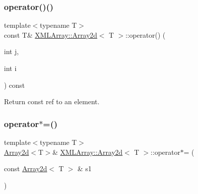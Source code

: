 \mbox{\label{classXMLArray_1_1Array2d_aa02dc8ee58bd33aca0cfbbf58cbf1ba7}} 
\subsubsection{\texorpdfstring{operator()()}{operator()()}\hspace{0.1cm}{\footnotesize\ttfamily [4/4]}}
{\footnotesize\ttfamily template$<$typename T$>$ \\
const T\& \mbox{\hyperlink{classXMLArray_1_1Array2d}{X\+M\+L\+Array\+::\+Array2d}}$<$ T $>$\+::operator() (\begin{DoxyParamCaption}\item[{int}]{j,  }\item[{int}]{i }\end{DoxyParamCaption}) const\hspace{0.3cm}{\ttfamily [inline]}}



Return const ref to an element. 

\mbox{\label{classXMLArray_1_1Array2d_a591d1e6e7de9fd024657bb6e9264a89b}} 
\subsubsection{\texorpdfstring{operator$\ast$=()}{operator*=()}\hspace{0.1cm}{\footnotesize\ttfamily [1/4]}}
{\footnotesize\ttfamily template$<$typename T$>$ \\
\mbox{\hyperlink{classXMLArray_1_1Array2d}{Array2d}}$<$T$>$\& \mbox{\hyperlink{classXMLArray_1_1Array2d}{X\+M\+L\+Array\+::\+Array2d}}$<$ T $>$\+::operator$\ast$= (\begin{DoxyParamCaption}\item[{const \mbox{\hyperlink{classXMLArray_1_1Array2d}{Array2d}}$<$ T $>$ \&}]{s1 }\end{DoxyParamCaption})\hspace{0.3cm}{\ttfamily [inline]}}




